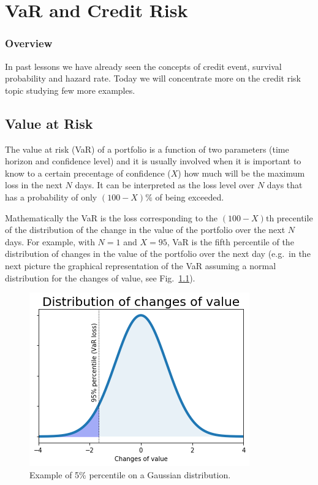 \chapter{VaR and Credit Risk}\label{var-and-credit-risk---practical-lesson-9}

\subsection{Overview}\label{overview}

In past lessons we have already seen the concepts of credit event,
survival probability and hazard rate. Today we will concentrate more on
the credit risk topic studying few more examples.

\section{Value at Risk}\label{value-at-risk}

The value at risk (VaR) of a portfolio is a function of two parameters
(time horizon and confidence level) and it is usually involved when it
is important to know to a certain precentage of confidence (\(X\)) how
much will be the maximum loss in the next $N$ days. It can be
interpreted as the loss level over \(N\) days that has a probability of
only \((100 - X)\%\) of being exceeded.

Mathematically the VaR is the loss corresponding to the
\((100-X)\textrm{th}\) precentile of the distribution of the change in
the value of the portfolio over the next \(N\) days. For example, with
\(N=1\) and \(X=95\), VaR is the fifth percentile of the distribution of
changes in the value of the portfolio over the next day (e.g.~in the
next picture the graphical representation of the VaR assuming a normal
distribution for the changes of value, see Fig.~\ref{fig:var_loss}).

    \begin{figure}
    \centering
      \includegraphics[width=0.6\linewidth]{lecture_9_files/lecture_9_2_0.png}
      \caption{Example of 5\% percentile on a Gaussian distribution.}
      \label{fig:var_loss}
    \end{figure}
    
